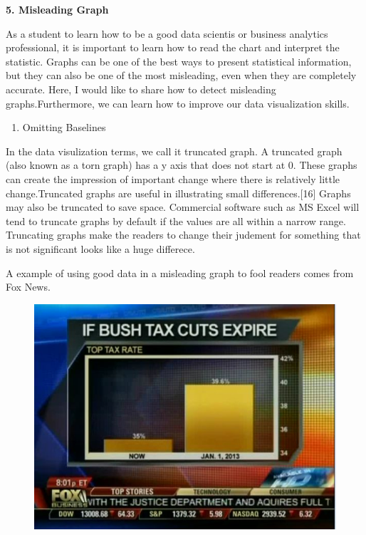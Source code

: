 \documentclass[]{book}
\providecommand{\tightlist}{%
  \setlength{\itemsep}{0pt}\setlength{\parskip}{0pt}}
\theoremstyle{definition}
\theoremstyle{definition}
\theoremstyle{definition}
\theoremstyle{remark}
\begin{document}
\textbf{5. Misleading Graph}

As a student to learn how to be a good data scientis or business
analytics professional, it is important to learn how to read the chart
and interpret the statistic. Graphs can be one of the best ways to
present statistical information, but they can also be one of the most
misleading, even when they are completely accurate. Here, I would like
to share how to detect misleading graphs.Furthermore, we can learn how
to improve our data visualization skills.

\begin{enumerate}
\def\labelenumi{\arabic{enumi}.}
\tightlist
\item
  Omitting Baselines
\end{enumerate}

In the data visulization terms, we call it truncated graph. A truncated
graph (also known as a torn graph) has a y axis that does not start at
0. These graphs can create the impression of important change where
there is relatively little change.Truncated graphs are useful in
illustrating small differences.{[}16{]} Graphs may also be truncated to
save space. Commercial software such as MS Excel will tend to truncate
graphs by default if the values are all within a narrow range.
Truncating graphs make the readers to change their judement for
something that is not significant looks like a huge differece.

A example of using good data in a misleading graph to fool readers comes
from Fox News.

\begin{figure}
\centering
\includegraphics{1.png}
\caption{}
\end{figure}
\end{document}
